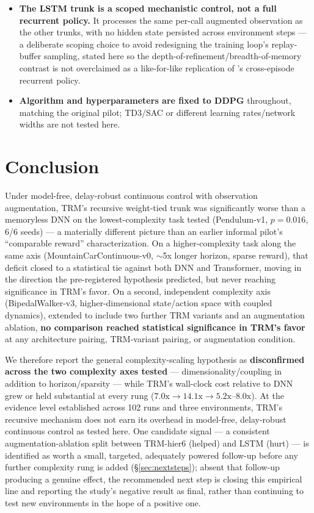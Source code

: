 \documentclass[11pt]{article}
\begin{document}
\begin{itemize}
  \item \textbf{The LSTM trunk is a scoped mechanistic control, not a full recurrent policy.} It processes the same per-call augmented observation as the other trunks, with no hidden state persisted across environment steps --- a deliberate scoping choice to avoid redesigning the training loop's replay-buffer sampling, stated here so the depth-of-refinement/breadth-of-memory contrast is not overclaimed as a like-for-like replication of \citet{bakker2007recurrent}'s cross-episode recurrent policy.
  \item \textbf{Algorithm and hyperparameters are fixed to DDPG} throughout, matching the original pilot; TD3/SAC or different learning rates/network widths are not tested here.
\end{itemize}

\section{Conclusion}

Under model-free, delay-robust continuous control with observation augmentation, TRM's recursive weight-tied trunk was significantly worse than a memoryless DNN on the lowest-complexity task tested (Pendulum-v1, $p=0.016$, 6/6 seeds) --- a materially different picture than an earlier informal pilot's ``comparable reward'' characterization. On a higher-complexity task along the same axis (MountainCarContinuous-v0, $\sim$5x longer horizon, sparse reward), that deficit closed to a statistical tie against both DNN and Transformer, moving in the direction the pre-registered hypothesis predicted, but never reaching significance in TRM's favor. On a second, independent complexity axis (BipedalWalker-v3, higher-dimensional state/action space with coupled dynamics), extended to include two further TRM variants and an augmentation ablation, \textbf{no comparison reached statistical significance in TRM's favor} at any architecture pairing, TRM-variant pairing, or augmentation condition.

We therefore report the general complexity-scaling hypothesis as \textbf{disconfirmed across the two complexity axes tested} --- dimensionality/coupling in addition to horizon/sparsity --- while TRM's wall-clock cost relative to DNN grew or held substantial at every rung ($7.0\text{x} \to 14.1\text{x} \to 5.2\text{x}$--$8.0\text{x}$). At the evidence level established across 102 runs and three environments, TRM's recursive mechanism does not earn its overhead in model-free, delay-robust continuous control as tested here. One candidate signal --- a consistent augmentation-ablation split between TRM-hier6 (helped) and LSTM (hurt) --- is identified as worth a small, targeted, adequately powered follow-up before any further complexity rung is added (\S\ref{sec:nextsteps}); absent that follow-up producing a genuine effect, the recommended next step is closing this empirical line and reporting the study's negative result as final, rather than continuing to test new environments in the hope of a positive one.
\end{document}
